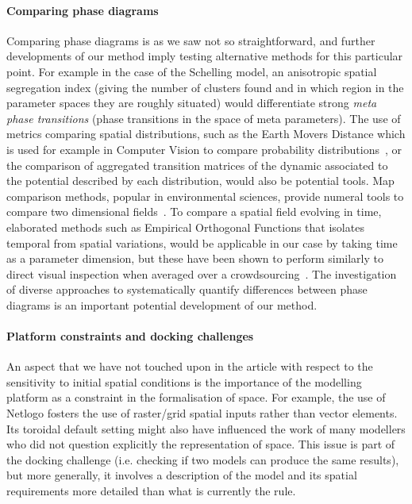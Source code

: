 \documentclass[3p,times,procedia]{elsarticle}
\begin{document}
\paragraph{Comparing phase diagrams} Comparing phase diagrams is as we saw not so straightforward, and further developments of our method imply testing alternative methods for this particular point. For example in the case of the Schelling model, an anisotropic spatial segregation index (giving the number of clusters found and in which region in the parameter spaces they are roughly situated) would differentiate strong \emph{meta phase transitions} (phase transitions in the space of meta parameters). The use of metrics comparing spatial distributions, such as the Earth Movers Distance which is used for example in Computer Vision to compare probability distributions~\citep{rubner2000earth}, or the comparison of aggregated transition matrices of the dynamic associated to the potential described by each distribution, would also be potential tools. Map comparison methods, popular in environmental sciences, provide numeral tools to compare two dimensional fields~\citep{visser2006map}. To compare a spatial field evolving in time, elaborated methods such as Empirical Orthogonal Functions that isolates temporal from spatial variations, would be applicable in our case by taking time as a parameter dimension, but these have been shown to perform similarly to direct visual inspection when averaged over a crowdsourcing~\citep{10.1371/journal.pone.0178165}. The investigation of diverse approaches to systematically quantify differences between phase diagrams is an important potential development of our method.



\paragraph{Platform constraints and docking challenges}

An aspect that we have not touched upon in the article with respect to the sensitivity to initial spatial conditions is the importance of the modelling platform as a constraint in the formalisation of space. For example, the use of Netlogo fosters the use of raster/grid spatial inputs rather than vector elements. Its toroidal default setting might also have influenced the work of many modellers who did not question explicitly the representation of space. This issue is part of the docking challenge \citep{Axtelletal1996} (i.e. checking if two models can produce the same results), but more generally, it involves a description of the model and its spatial requirements more detailed than what is currently the rule.
\end{document}
